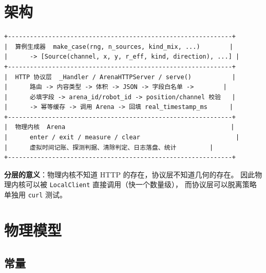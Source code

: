 \section{架构}

\begin{lstlisting}[caption={三层结构与职责边界}]
+-------------------------------------------------------------+
|  算例生成器  make_case(rng, n_sources, kind_mix, ...)        |
|      -> [Source(channel, x, y, r_eff, kind, direction), ...] |
+-------------------------------------------------------------+
|  HTTP 协议层  _Handler / ArenaHTTPServer / serve()           |
|      路由 -> 内容类型 -> 体积 -> JSON -> 字段白名单 ->        |
|      必填字段 -> arena_id/robot_id -> position/channel 校验   |
|      -> 幂等缓存 -> 调用 Arena -> 回填 real_timestamp_ms      |
+-------------------------------------------------------------+
|  物理内核  Arena                                             |
|      enter / exit / measure / clear                          |
|      虚拟时间记账、探测判据、清除判定、日志落盘、统计         |
+-------------------------------------------------------------+
\end{lstlisting}

\textbf{分层的意义}：物理内核不知道 HTTP 的存在，协议层不知道几何的存在。
因此物理内核可以被 \texttt{LocalClient} 直接调用（快一个数量级），
而协议层可以脱离策略单独用 \texttt{curl} 测试。

\section{物理模型}

\subsection{常量}

